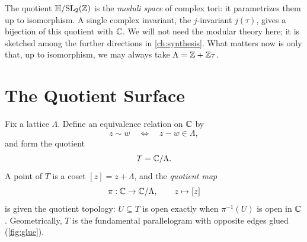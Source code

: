 \begin{remark}
\label{rem:lat-moduli}
The quotient \(\mathbb{H} / \mathrm{SL}_2(\mathbb{Z})\) is the \emph{moduli space} of complex
tori: it parametrizes them up to isomorphism. A single complex invariant, the
\(j\)-invariant \(j(\tau)\), gives a bijection of this quotient with \(\mathbb{C}\). We
will not need the modular theory here; it is sketched among the further
directions in \cref{ch:synthesis}. What matters now is only that, up to
isomorphism, we may always take \(\Lambda = \mathbb{Z} + \mathbb{Z}\tau\).
\end{remark}

\section{The Quotient Surface}
\label{sec:lat-quotient}

Fix a lattice \(\Lambda\). Define an equivalence relation on \(\mathbb{C}\) by
\[
  z \sim w \quad\Longleftrightarrow\quad z - w \in \Lambda,
\]
and form the quotient
\[
  T = \mathbb{C}/\Lambda .
\]
A point of \(T\) is a coset \([z] = z + \Lambda\), and the \emph{quotient map}
\[
  \pi : \mathbb{C} \to \mathbb{C}/\Lambda, \qquad z \mapsto [z]
\]
is given the quotient topology: \(U \subseteq T\) is open exactly when
\(\pi^{-1}(U)\) is open in \(\mathbb{C}\). Geometrically, \(T\) is the fundamental
parallelogram with opposite edges glued (\cref{fig:glue}).

